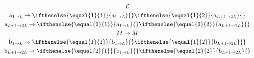\renewcommand{\aa}{\mathrm{a}}
\newcommand{\bb}{\mathrm{b}}
\renewcommand{\b}{\hat{b}}
\renewcommand{\a}{\hat{a}}
\newcommand{\Diss}{\mathcal{D}}
\renewcommand{\L}[1]{%
  \ifthenelse{\equal{#1}{1}}{1\rightarrow L}{}
  \ifthenelse{\equal{#1}{2}}{{L+1}\rightarrow 2L}{}
    }
\newcommand{\rh}{\hat{\rho}}
\renewcommand{\P}{\textbf{P}}
\renewcommand{\G}{\Gamma}
\newcommand{\LL}{\mathcal{L}}
\newcommand{\DD}{\mathcal{D}}
\renewcommand{\K}{\kappa}
\renewcommand{\O}{\textbf{O}}
\newcommand{\Om}{\Omega}
\newcommand{\AL}[1]{%
    \ifthenelse{\equal{#1}{1}}{\aa_{1\rightarrow L}}{}
    \ifthenelse{\equal{#1}{2}}{\aa_{{L+1}\rightarrow 2L}}{}
    }
\renewcommand{\S}{\hat{S}}
\newcommand{\BL}[1]{%
    \ifthenelse{\equal{#1}{1}}{\bb_{1\rightarrow L}}{}
    \ifthenelse{\equal{#1}{2}}{\bb_{{L+1}\rightarrow 2L}}{}
    }
\newcommand{\TW}{\Tilde{W}}  
\newcommand{\WW}{W}
\newcommand{\MM}{M}
\begin{gather*}
\mathcal{L}\\
\mathrm{a}_{1\rightarrow L} \rightarrow \AL{1}\\
\mathrm{a}_{{L+1}\rightarrow 2L} \rightarrow \AL{2}\\
M\rightarrow \MM \\
\mathrm{b}_{1\rightarrow L} \rightarrow \BL{1}\\
\mathrm{b}_{{L+1}\rightarrow 2L} \rightarrow \BL{2}\\
\end{gather*}


